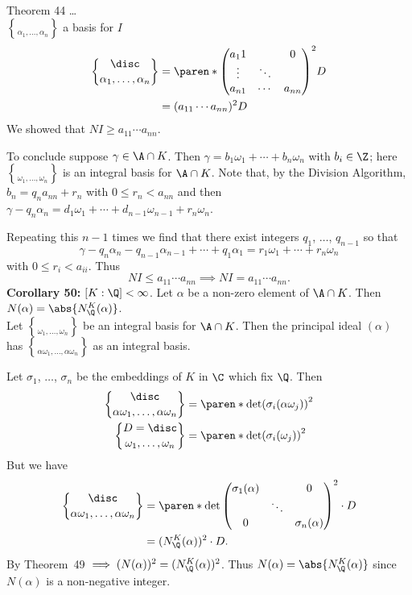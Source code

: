 Theorem 44 \dots \\
$\brace{\alpha_1,\dotsc,\alpha_n}$ a basis for $I$
\begin{align*}
\disc\brace{\alpha_1,\dotsc,\alpha_n} &= \paren*{\begin{pmatrix}
a_11 & & 0 \\
\vdots & \ddots & \\
a_{n1} & \cdots & a_{nn}
\end{pmatrix}}^2 D \\
&= (a_{11}\dotsm a_{nn})^2 D
\end{align*}
We showed that $NI\geq a_{11}\dotsm a_{nn}$.

To conclude suppose $\gamma\in\A\cap K$.  Then $\gamma=b_1\omega_1+\dotsb+b_n\omega_n$ with $b_i\in\Z$; here $\brace{\omega_1,\dotsc,\omega_n}$ is an integral basis for $\A\cap K$.  Note that, by the Division Algorithm, $b_n=q_n a_{nn} + r_n$ with $0\leq r_n<a_{nn}$ and then $\gamma-q_n\alpha_n=d_1\omega_1+\dotsb+d_{n-1}\omega_{n-1}+r_n\omega_n$.

Repeating this $n-1$ times we find that there exist integers $q_1$, $\dotsc$, $q_{n-1}$ so that
\[ \gamma - q_n\alpha_n - q_{n-1}\alpha_{n-1} + \dotsb + q_1\alpha_1 = r_1\omega_1 + \dotsb + r_n\omega_n \]
with $0\leq r_i<a_{ii}$.  Thus
\[ NI \leq a_{11}\dotsm a_{nn} \implies NI = a_{11}\dotsm a_{nn} . \]
\textbf{Corollary 50:} $[K:\Q]<\infty$.  Let $\alpha$ be a non-zero element of $\A\cap K$.  Then $N(\alpha)=\abs{N_\Q^K(\alpha)}$. \\
\pf Let $\brace{\omega_1,\dotsc,\omega_n}$ be an integral basis for $\A\cap K$.  Then the principal ideal $(\alpha)$ has $\brace{\alpha\omega_1,\dotsc,\alpha\omega_n}$ as an integral basis.

Let $\sigma_1$, $\dotsc$, $\sigma_n$ be the embeddings of $K$ in $\C$ which fix $\Q$.  Then
\begin{align*}
\disc\brace{\alpha\omega_1,\dotsc,\alpha\omega_n} &= \paren*{\det(\sigma_i(\alpha\omega_j))}^2 \\
D = \disc\brace{\omega_1,\dotsc,\omega_n} &= \paren*{\det(\sigma_i(\omega_j))}^2
\end{align*}
But we have
\begin{align*}
\disc\brace{\alpha\omega_1,\dotsc,\alpha\omega_n} &= \paren*{\det\begin{pmatrix}
\sigma_1(\alpha) & & 0 \\
& \ddots & \\
0 & & \sigma_n(\alpha)
\end{pmatrix}}^2\cdot D \\
&= (N_\Q^K(\alpha))^2 \cdot D .
\end{align*}
By Theorem~49 $\implies(N(\alpha))^2=(N_\Q^K(\alpha))^2$.  Thus $N(\alpha)=\abs{N_\Q^K(\alpha)}$ since $N(\alpha)$ is a non-negative integer.

